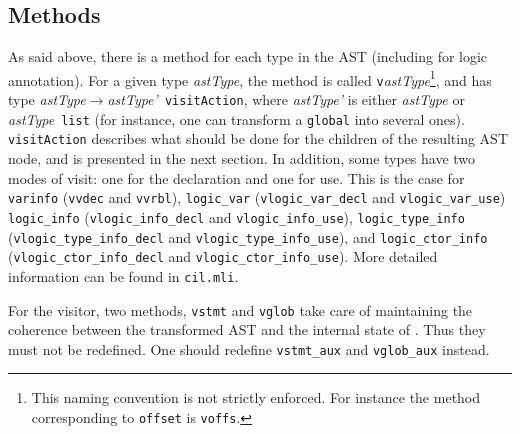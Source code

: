\subsection{Methods}\label{adv:sec:methods}

As said above, there is a method for each type in the \cil AST
(including for logic annotation). For a given type
\emph{astType}, the method is called \texttt{v}\emph{astType}\footnote{This
  naming convention is not strictly enforced. For instance the method
  corresponding to \texttt{offset} is
  \texttt{voffs}.}, and has type
\mbox{\emph{astType}$\rightarrow$\emph{astType'}~\texttt{visitAction}}, where
\emph{astType'} is either \emph{astType} or \emph{astType}~\texttt{list} (for
instance, one can transform a \verb+global+ into
several ones). \texttt{visitAction} describes
what should be done for the children of the resulting AST node, and is
presented in the next section. In addition, some types have two modes
of visit: one for the declaration and one for use. This is the case for
\verb+varinfo+
(\verb+vvdec+ and
\verb+vvrbl+),
\verb+logic_var+
(\verb+vlogic_var_decl+ and
\verb+vlogic_var_use+)
\verb+logic_info+
(\verb+vlogic_info_decl+ and
\verb+vlogic_info_use+),
\verb+logic_type_info+
(\verb+vlogic_type_info_decl+ and
\verb+vlogic_type_info_use+), and
\verb+logic_ctor_info+
(\verb+vlogic_ctor_info_decl+ and
\verb+vlogic_ctor_info_use+).
More detailed information can be found in \verb+cil.mli+.

\begin{important}
  For the \framac visitor, two methods,
  \verb+vstmt+ 
  and \verb+vglob+ take
  care of maintaining the coherence between the transformed
  AST and the internal state of \framac%
  . Thus they must not be redefined. One should redefine
  \verb+vstmt_aux+ and
  \verb+vglob_aux+ instead.
\end{important}


